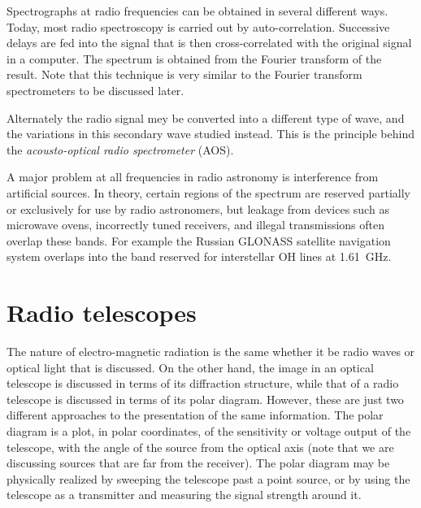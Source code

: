 Spectrographs at radio frequencies can be obtained in several different ways. 
Today, most radio spectroscopy is carried out by auto-correlation. Successive
delays are fed into the signal that is then cross-correlated with the original
signal in a computer. The spectrum is obtained from the Fourier transform
of the result. Note that this technique is very similar to the Fourier
transform spectrometers to be discussed later.

Alternately the radio signal mey be converted into a different type of
wave, and the variations in this secondary wave studied instead. This
is the principle behind the {\it acousto-optical radio spectrometer} (AOS).

A major problem at all frequencies in radio astronomy is interference from
artificial sources. In theory, certain regions of the spectrum are reserved
partially or exclusively for use by radio astronomers, but leakage from
devices such as microwave ovens, incorrectly tuned receivers, and illegal 
transmissions often overlap these bands. For example the Russian GLONASS
satellite navigation system overlaps into the band reserved for interstellar
OH lines at 1.61~GHz.

\section{Radio telescopes}

The nature of electro-magnetic radiation is the same whether it be radio waves
or optical light that is discussed. On the other hand, the image in an optical 
telescope is discussed in terms of its diffraction structure, while that of 
a radio telescope is discussed in terms of its polar diagram. However, these 
are just two different approaches to the presentation of the same information.
The polar diagram is a plot, in polar coordinates, of the sensitivity or 
voltage output of the telescope, with the angle of the source from the
optical axis (note that we are discussing sources that are far from the 
receiver). The polar diagram may be physically realized by sweeping the 
telescope past a point source, or by using the telescope as a transmitter
and measuring the signal strength around it.

